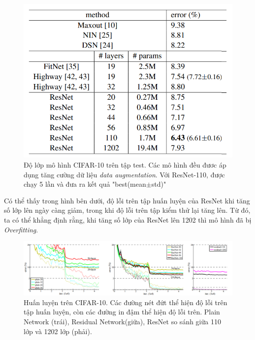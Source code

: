 \documentclass[a4paper, 12pt]{article}
\begin{document}
\begin{figure}[H]
    \begin{center}
        \includegraphics[scale=0.4]{img/overfitting-table}
        \caption{Độ lớp mô hình CIFAR-10 trên tập test. Các mô hình đều đươc áp dụng tăng cường dữ liệu  \textit{data augmentation}. Với ResNet-110, được chạy 5 lần và đưa ra kết quả "best(mean$\pm$std)"}
    \end{center}
\end{figure}
Có thể thấy trong hình bên dưới, độ lỗi trên tập huấn luyện của ResNet khi tăng số lớp lên ngày càng giảm, trong khi độ lỗi trên tập kiểm thử lại tăng lên. Từ đó, ta có thể khẳng định rằng, khi tăng số lớp của ResNet lên 1202 thì mô hình đã bị \textit{Overfitting}.
\begin{figure}[H]
    \begin{center}
        \includegraphics[scale=0.4]{img/overfitting-img}
        \caption{Huấn luyện trên CIFAR-10. Các đường nét đứt thể hiện độ lỗi trên tập huấn luyện, còn các đường in đậm thể hiện độ lỗi trên. Plain Network (trái), Residual Network(giữa), ResNet so sánh giữa 110 lớp và 1202 lớp (phải).}
    \end{center}
\end{figure}
\end{document}
